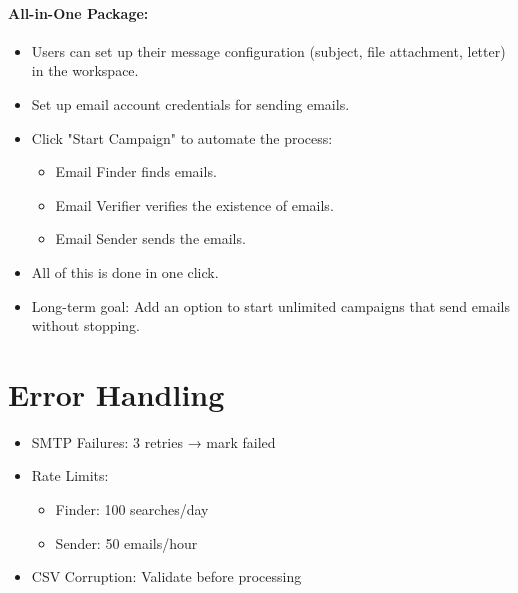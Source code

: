 \documentclass{article}
\begin{document}
\paragraph{All-in-One Package:}
\begin{itemize}
    \item Users can set up their message configuration (subject, file attachment, letter) in the workspace.
    \item Set up email account credentials for sending emails.
    \item Click "Start Campaign" to automate the process:
    \begin{itemize}
        \item Email Finder finds emails.
        \item Email Verifier verifies the existence of emails.
        \item Email Sender sends the emails.
    \end{itemize}
    \item All of this is done in one click.
    \item Long-term goal: Add an option to start unlimited campaigns that send emails without stopping.
\end{itemize}

\section{Error Handling}
\begin{itemize}
    \item SMTP Failures: 3 retries → mark failed
    \item Rate Limits:
    \begin{itemize}
        \item Finder: 100 searches/day
        \item Sender: 50 emails/hour
    \end{itemize}
    \item CSV Corruption: Validate before processing
\end{itemize}
\end{document}
